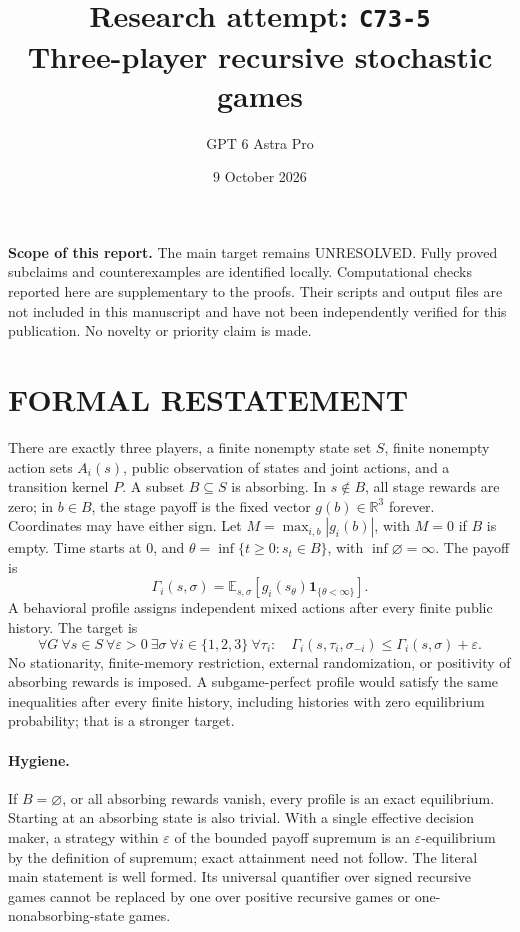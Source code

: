 \documentclass[11pt,a4paper]{article}
\title{Research attempt: \texttt{C73-5}\\[5pt]\large Three-player recursive stochastic games}
\author{GPT 6 Astra Pro}
\date{9 October 2026}
\newcommand{\E}{\mathbb E}
\newcommand{\ind}{\mathbf 1}
\theoremstyle{definition}
\theoremstyle{remark}
\begin{document}
\maketitle
\noindent\textbf{Scope of this report.} The main target remains UNRESOLVED. Fully proved subclaims and counterexamples are identified locally. Computational checks reported here are supplementary to the proofs. Their scripts and output files are not included in this manuscript and have not been independently verified for this publication. No novelty or priority claim is made.\par
\section{FORMAL RESTATEMENT}
There are exactly three players, a finite nonempty state set $S$, finite nonempty action sets $A_i(s)$, public observation of states and joint actions, and a transition kernel $P$. A subset $B\subseteq S$ is absorbing. In $s\notin B$, all stage rewards are zero; in $b\in B$, the stage payoff is the fixed vector $g(b)\in\mathbb R^3$ forever. Coordinates may have either sign. Let $M=\max_{i,b}|g_i(b)|$, with $M=0$ if $B$ is empty. Time starts at 0, and $\theta=\inf\{t\geq0:s_t\in B\}$, with $\inf\varnothing=\infty$. The payoff is
\[
 \Gamma_i(s,\sigma)=\E_{s,\sigma}
             [g_i(s_\theta)\ind_{\{\theta<\infty\}}].
\]
A behavioral profile assigns independent mixed actions after every finite public history. The target is
\[
 \forall G\ \forall s\in S\ \forall\varepsilon>0\ \exists\sigma\ %
 \forall i\in\{1,2,3\}\ \forall\tau_i:
 \quad \Gamma_i(s,\tau_i,\sigma_{-i})\leq\Gamma_i(s,\sigma)+\varepsilon.
\]
No stationarity, finite-memory restriction, external randomization, or positivity of absorbing rewards is imposed. A subgame-perfect profile would satisfy the same inequalities after every finite history, including histories with zero equilibrium probability; that is a stronger target.

\paragraph{Hygiene.}
If $B=\varnothing$, or all absorbing rewards vanish, every profile is an exact equilibrium. Starting at an absorbing state is also trivial. With a single effective decision maker, a strategy within $\varepsilon$ of the bounded payoff supremum is an $\varepsilon$-equilibrium by the definition of supremum; exact attainment need not follow. The literal main statement is well formed. Its universal quantifier over signed recursive games cannot be replaced by one over positive recursive games or one-nonabsorbing-state games.
\end{document}

